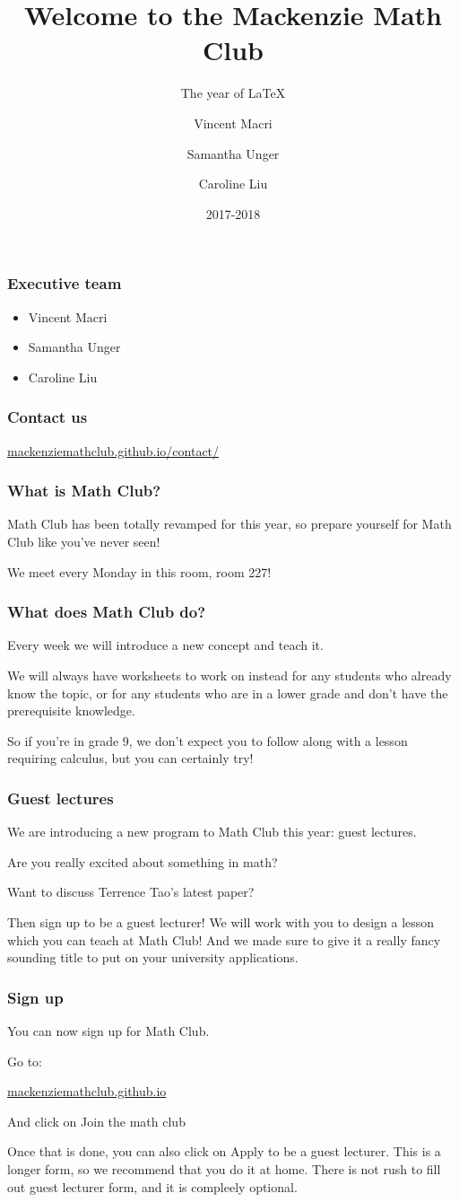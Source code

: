\documentclass[mathserif]{beamer}
\title{Welcome to the Mackenzie Math Club}
\subtitle{The year of \textrm{\LaTeX{}}}
\author{Vincent Macri \and Samantha Unger \and Caroline Liu}
\date{2017-2018}
\begin{document}
	\frame{\titlepage}
	\begin{frame}
		\frametitle{Executive team}
		\pause
		\begin{itemize}[<+->]
			\item Vincent Macri
			\item Samantha Unger
			\item Caroline Liu
		\end{itemize}
	\end{frame}
	\begin{frame}
		\frametitle{Contact us}
		\begin{center}
			\Large
			\url{mackenziemathclub.github.io/contact/}
		\end{center}
	\end{frame}
	\begin{frame}
		\frametitle{What is Math Club?}
		Math Club has been totally revamped for this year, so prepare yourself for Math Club like you've never seen!

		We meet every Monday in \alert{this} room, room 227!
	\end{frame}
	\begin{frame}
		\frametitle{What does Math Club do?}
		Every week we will introduce a new concept and teach it.
		\pause
		
		We will always have worksheets to work on instead for any students who already know the topic, or for any students who are in a lower grade and don't have the prerequisite knowledge.
		\pause

		So if you're in grade 9, we don't expect you to follow along with a lesson requiring calculus, but you can certainly try!
	\end{frame}
	\begin{frame}
		\frametitle{Guest lectures}
		We are introducing a new program to Math Club this year: guest lectures.
		\pause

		Are you really excited about something in math?
		\pause

		Want to discuss Terrence Tao's latest paper?
		\pause

		Then sign up to be a guest lecturer! We will work with you to design a lesson which you can teach at Math Club! And we made sure to give it a really fancy sounding title to put on your university applications.
	\end{frame}
	\begin{frame}
		\frametitle{Sign up}
		You can now sign up for Math Club.

		Go to:
		\begin{center}
			\huge
			\url{mackenziemathclub.github.io}
		\end{center}
		And click on \alert{Join the math club}
		\pause

		Once that is done, you can also click on \alert{Apply to be a guest lecturer}. This is a longer form, so we recommend that you do it at home. There is not rush to fill out guest lecturer form, and it is compleely optional.
	\end{frame}
\end{document}
